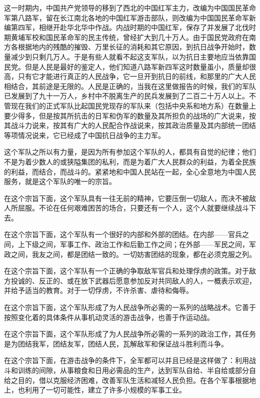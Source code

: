这一时期内，中国共产党领导的移到了西北的中国红军主力，改编为中国国民革命军第八路军，留在长江南北各地的中国红军游击部队，则改编为中国国民革命军新编第四军，相继开赴华北华中作战。内战时期的中国红军，保存了并发展了北伐时期黄埔军校和国民革命军的民主传统，曾经扩大到几十万人。由于国民党政府在南方各根据地内的残酷的摧毁、万里长征的消耗和其它原因，到抗日战争开始时，数量减少到只剩几万人。于是有些人就看不起这支军队，以为抗日主要地应当依靠国民党。但是人民是最好的鉴定人，他们知道八路军新四军这时数量虽小，质量却很高，只有它才能进行真正的人民战争，它一旦开到抗日的前线，和那里的广大人民相结合，其前途是无限的。人民是正确的，当我在这里做报告的时候，我们的军队已发展到了九十一万人，乡村中不脱离生产的民兵发展到了二百二十万人以上。不管现在我们的正式军队比起国民党现存的军队来（包括中央系和地方系）在数量上要少得多，但是按其所抗击的日军和伪军的数量及其所担负的战场的广大说来，按其战斗力说来，按其有广大的人民配合作战说来，按其政治质量及其内部统一团结等项情况说来，它已经成了中国抗日战争的主力军。

这个军队之所以有力量，是因为所有参加这个军队的人，都具有自觉的纪律；他们不是为着少数人的或狭隘集团的私利，而是为着广大人民群众的利益，为着全民族的利益，而结合，而战斗的。紧紧地和中国人民站在一起，全心全意地为中国人民服务，就是这个军队的唯一的宗旨。

在这个宗旨下面，这个军队具有一往无前的精神，它要压倒一切敌人，而决不被敌人所屈服。不论在任何艰难困苦的场合，只要还有一个人，这个人就要继续战斗下去。

在这个宗旨下面，这个军队有一个很好的内部和外部的团结。在内部——官兵之间，上下级之间，军事工作、政治工作和后勤工作之间；在外部——军民之间，军政之间，我友之间，都是团结一致的。一切妨害团结的现象，都在必须克服之列。

在这个宗旨下面，这个军队有一个正确的争取敌军官兵和处理俘虏的政策。对于敌方投诚的、反正的、或在放下武器后愿意参加反对共同敌人的人，一概表示欢迎，并给予适当的教育。对于一切俘虏，不许杀害、虐待和侮辱。

在这个宗旨下面，这个军队形成了为人民战争所必需的一系列的战略战术。它善于按照变化着的具体条件从事机动灵活的游击战争，也善于作运动战。

在这个宗旨下面，这个军队形成了为人民战争所必需的一系列的政治工作，其任务是为团结我军，团结友军，团结人民，瓦解敌军和保证战斗胜利而斗争。

在这个宗旨下面，在游击战争的条件下，全军都可以并且已经是这样做了：利用战斗和训练的间隙，从事粮食和日用必需品的生产，达到军队自给、半自给或部分自给之目的，借以克服经济困难，改善军队生活和减轻人民负担。在各个军事根据地上，也利用了一切可能性，建立了许多小规模的军事工业。

